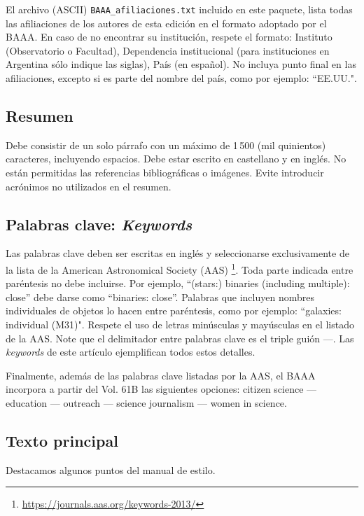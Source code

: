 \documentclass[baaa]{baaa}
\begin{document}
El archivo ({\sc ASCII}) {\tt BAAA\_afiliaciones.txt} incluido en este paquete, lista todas las afiliaciones de los autores de esta edición en el formato adoptado por el BAAA. En caso de no encontrar su institución, respete el formato: Instituto (Observatorio o Facultad), Dependencia institucional (para instituciones en Argentina sólo indique las siglas), País (en español).  No incluya punto final en las afiliaciones, excepto si es parte del nombre del país, como por ejemplo: ``EE.UU.".

\subsection{Resumen}

Debe consistir de un solo párrafo con un máximo de 1\,500 (mil quinientos) caracteres, incluyendo espacios. Debe estar escrito en castellano y en inglés. No están permitidas las referencias bibliográficas o imágenes. Evite introducir acrónimos no utilizados en el resumen. 

\subsection{Palabras clave: \textit{Keywords}}

Las palabras clave deben ser escritas en inglés y seleccionarse exclusivamente de la lista de la American Astronomical Society (AAS) \footnote{\url{https://journals.aas.org/keywords-2013/}}. Toda parte indicada entre paréntesis no debe incluirse. Por ejemplo, ``(stars:) binaries (including multiple): close'' debe darse como ``binaries: close''. Palabras que incluyen nombres individuales de objetos lo hacen entre paréntesis, como por ejemplo: ``galaxies: individual (M31)". Respete el uso de letras minúsculas y mayúsculas en el listado de la AAS. Note que el delimitador entre palabras clave es el triple guión ---. Las {\em keywords} de este artículo ejemplifican todos estos detalles. 

Finalmente, además de las palabras clave listadas por la AAS, el BAAA incorpora a partir del Vol. 61B las siguientes opciones: {citizen science --- education --- outreach --- science journalism --- women in science}.

\subsection{Texto principal}

Destacamos algunos puntos del manual de estilo.
\end{document}
